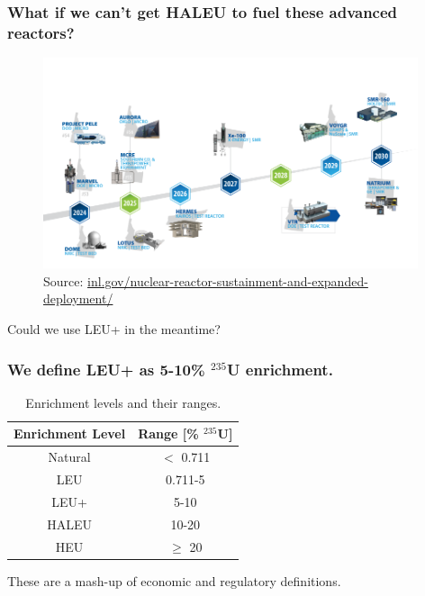 \documentclass[9pt]{beamer}
\begin{document}
  \begin{frame}
    \frametitle{What if we can't get HALEU to fuel these advanced reactors?}
    \vspace{-25pt}
    \begin{figure}
        \centering
        \includegraphics[width=0.98\textwidth]{images/reactor_timeline.png}
        \caption{Source: \url{inl.gov/nuclear-reactor-sustainment-and-expanded-deployment/}}
    \end{figure}
    \vspace{-8pt}
    Could we use LEU+ in the meantime?
  \end{frame}

  \begin{frame}
    \frametitle{We define LEU+ as 5-10\% $^{235}$U enrichment.}
    \begin{table}[H]
        \centering
        \caption{Enrichment levels and their ranges.}
        \label{tab:enrichment_levels}
        \begin{tabular}{c c}
           \hline
           \textbf{Enrichment Level} & \textbf{Range [\%  $^{235}$U]} \\
           \hline
           Natural & $<$ 0.711 \\
           LEU & 0.711-5 \\
           LEU+ & 5-10 \\
           HALEU & 10-20 \\
           HEU & $\geq$ 20  \\
           \hline
        \end{tabular}
     \end{table}
     These are a mash-up of economic and regulatory definitions.
  \end{frame}
\end{document}
